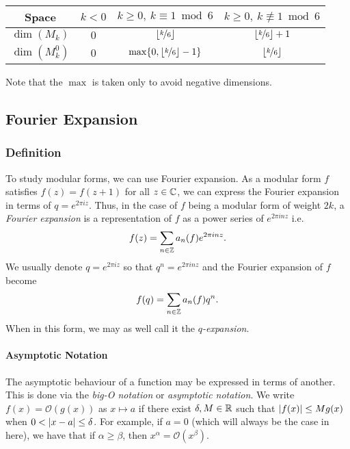 \begin{center}
\begin{tabular}{||c||c|c|c||} 
    \hline
    Space & $k<0$ & $k \geq 0, \ k \equiv 1 \bmod 6$ & $k \geq 0, \ k \not \equiv 1 \bmod 6$ \\
    \hline
    \hline
    $\dim(M_k)$ & $0$ & $\lfloor \nicefrac{k}{6} \rfloor$ & $\lfloor \nicefrac{k}{6} \rfloor + 1$ \\
    \hline
    $\dim(M_k^0)$ & $0$ & $\max\{0, \lfloor \nicefrac{k}{6} \rfloor - 1\}$ & $\lfloor \nicefrac{k}{6} \rfloor$ \\
    \hline
\end{tabular}
\end{center}
Note that the $\max$ is taken only to avoid negative dimensions.



\subsection{Fourier Expansion}
\subsubsection{Definition}
To study modular forms, we can use Fourier expansion.
As a modular form $f$ satisfies $f(z) = f(z+1)$ for all $z \in \mathbb{C}$, we can express the Fourier expansion in terms of $q = e^{2 \pi i z}$.
Thus, in the case of $f$ being a modular form of weight $2k$, 
a \textit{Fourier expansion} is a representation of $f$ as a power series of $e^{2\pi i n z}$
i.e. $$f(z) = \sum_{n \in \mathbb{Z}} a_n(f) e^{2\pi inz}.$$
We usually denote $q = e^{2\pi i z}$ so that $q^n = e^{2\pi i n z}$ 
and the Fourier expansion of $f$ become 
$$
f(q) = \sum_{n \in \mathbb{Z}} a_n(f) q^n.
$$
When in this form, we may as well call it the \textit{$q$-expansion}.

\paragraph{Asymptotic Notation}
The asymptotic behaviour of a function may be expressed in terms of another.
This is done via the \textit{big-O notation} or \textit{asymptotic notation}.
We write $f(x) = \mathcal{O}(g(x))$ as $x \mapsto a$ if there exist $\delta, M \in \mathbb{R}$ such that $| f(x) | \leq Mg(x)$ when $0 < | x-a | \leq \delta$.
For example, if $a=0$ (which will always be the case in here), we have that if $\alpha \geq \beta$, then $x^{\alpha} = \mathcal{O}(x^{\beta})$.

